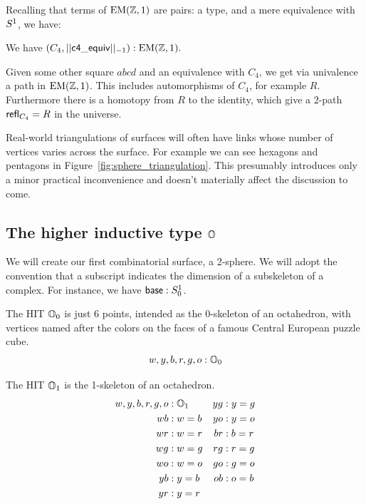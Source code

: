 Recalling that terms of \( \mathrm{EM}(\mathbb{Z},1) \) are pairs: a type, and a mere equivalence with \( S^1 \), we have:

\begin{mycor}
We have \( (C_4,||\mathsf{c4\_equiv}||_{-1}):\mathrm{EM}(\mathbb{Z},1). \)
\end{mycor}

Given some other square \( abcd \) and an equivalence with \( C_4 \), we get via univalence a path in \( \mathrm{EM}(\mathbb{Z},1) \). This includes automorphisms of \( C_4 \), for example \( R \). Furthermore there is a homotopy from \( R \) to the identity, which give a 2-path \( \mathsf{refl}_{C_4}=R \) in the universe.

Real-world triangulations of surfaces will often have links whose number of vertices varies across the surface. For example we can see hexagons and pentagons in Figure~\ref{fig:sphere_triangulation}. This presumably introduces only a minor practical inconvenience and doesn't materially affect the discussion to come.

\subsection{\texorpdfstring{The higher inductive type \( \mathbb{O} \)}{The higher inductive type O}}

We will create our first combinatorial surface, a 2-sphere. We will adopt the convention that a subscript indicates the dimension of a subskeleton of a complex. For instance, we have \( \mathsf{base}:S^1_0 \).

\begin{mydef}
The HIT \( \mathbb{O}_0 \) is just 6 points, intended as the 0-skeleton of an octahedron, with vertices named after the colors on the faces of a famous Central European puzzle cube.
\[ w, y, b, r, g, o : \mathbb{O}_0 \]
\end{mydef}

\begin{mydef}
The HIT \( \mathbb{O}_1 \) is the 1-skeleton of an octahedron.
\begin{align*}
w, y, b, r, g, o &: \mathbb{O}_1 & yg &: y=g \\
wb &: w=b & yo &: y=o \\
wr &: w=r & br &: b=r \\
wg &: w=g & rg &: r=g \\
wo &: w=o & go &: g=o \\
yb &: y=b & ob &: o=b \\
yr &: y=r
\end{align*}
\end{mydef}

